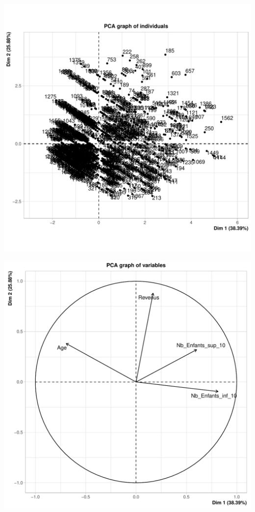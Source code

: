 \documentclass[11pt,a4paper, x11names]{article}\usepackage[]{graphicx}\usepackage[]{color}
\makeatletter
\def\maxwidth{ %
  \ifdim\Gin@nat@width>\linewidth
    \linewidth
  \else
    \Gin@nat@width
  \fi
}
\newenvironment{knitrout}{}{} %
\makeatother
\begin{document}
\begin{knitrout}
\color{fgcolor}
\includegraphics[width=\maxwidth]{figure/acp-1} 

\includegraphics[width=\maxwidth]{figure/acp-2} 
\end{knitrout}
\end{document}
